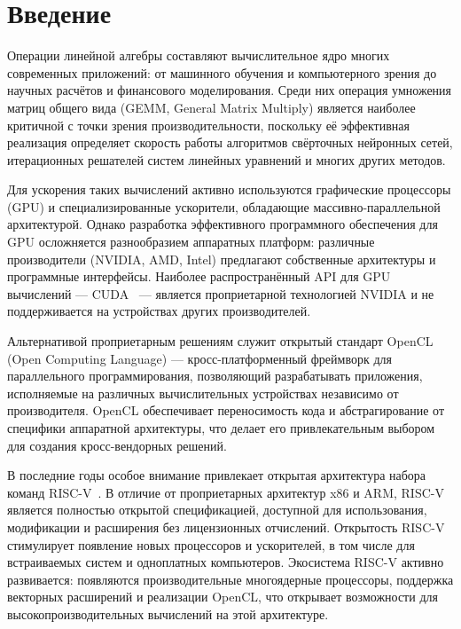 
\section*{Введение}
\thispagestyle{withCompileDate}

Операции линейной алгебры составляют вычислительное ядро многих современных приложений: от машинного обучения и компьютерного зрения до научных расчётов и финансового моделирования. Среди них операция умножения матриц общего вида (GEMM, General Matrix Multiply) является наиболее критичной с точки зрения производительности, поскольку её эффективная реализация определяет скорость работы алгоритмов свёрточных нейронных сетей, итерационных решателей систем линейных уравнений и многих других методов.

Для ускорения таких вычислений активно используются графические процессоры (GPU) и специализированные ускорители, обладающие массивно-параллельной архитектурой. Однако разработка эффективного программного обеспечения для GPU осложняется разнообразием аппаратных платформ: различные производители (NVIDIA, AMD, Intel) предлагают собственные архитектуры и программные интерфейсы. Наиболее распространённый API для GPU вычислений --- CUDA~\cite{nickolls2008cuda} --- является проприетарной технологией NVIDIA и не поддерживается на устройствах других производителей.

Альтернативой проприетарным решениям служит открытый стандарт OpenCL~\cite{opencl_spec} (Open Computing Language) --- кросс-платформенный фреймворк для параллельного программирования, позволяющий разрабатывать приложения, исполняемые на различных вычислительных устройствах независимо от производителя. OpenCL обеспечивает переносимость кода и абстрагирование от специфики аппаратной архитектуры, что делает его привлекательным выбором для создания кросс-вендорных решений.

В последние годы особое внимание привлекает открытая архитектура набора команд RISC-V~\cite{waterman2014risc}. В отличие от проприетарных архитектур x86 и ARM, RISC-V является полностью открытой спецификацией, доступной для использования, модификации и расширения без лицензионных отчислений. Открытость RISC-V стимулирует появление новых процессоров и ускорителей, в том числе для встраиваемых систем и одноплатных компьютеров. Экосистема RISC-V активно развивается: появляются производительные многоядерные процессоры, поддержка векторных расширений и реализации OpenCL, что открывает возможности для высокопроизводительных вычислений на этой архитектуре.

